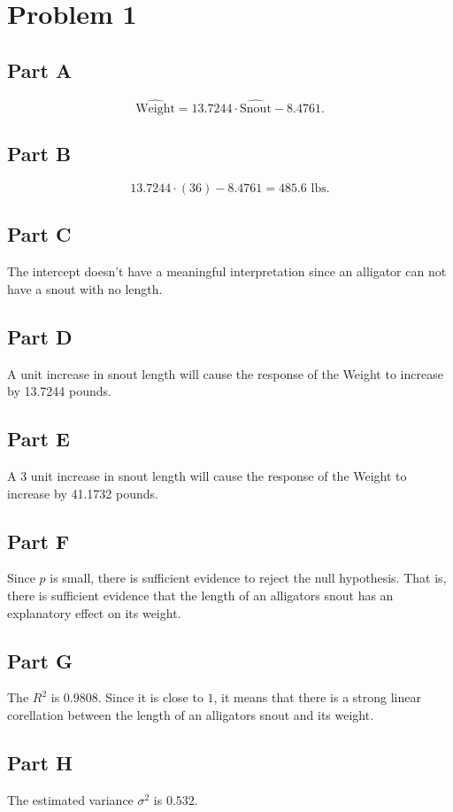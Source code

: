 \documentclass[12pt]{extarticle}
\begin{document}
\section*{Problem 1}
\subsection*{Part A}
\[
	\widehat{\text{Weight}} = 13.7244\cdot\widehat{\text{Snout}} - 8.4761
.\]

\subsection*{Part B}
\[
	13.7244 \cdot (36) - 8.4761 = 485.6\text{ lbs}
.\]

\subsection*{Part C}
The intercept doesn't have a meaningful interpretation since an alligator can not have a snout with no length.

\subsection*{Part D}
A unit increase in snout length will cause the response of the Weight to increase by 13.7244 pounds.

\subsection*{Part E}
A 3 unit increase in snout length will cause the response of the Weight to increase by 41.1732 pounds.

\subsection*{Part F}
Since $p$ is small, there is sufficient evidence to reject the null hypothesis. That is, there is sufficient evidence that the length of an alligators snout has an explanatory effect on its weight.

\subsection*{Part G}
The $R^2$ is $0.9808$. Since it is close to $1$, it means that there is a strong linear corellation between the length of an alligators snout and its weight.

\subsection*{Part H}
The estimated variance $\sigma^2$ is $0.532$.
\end{document}

